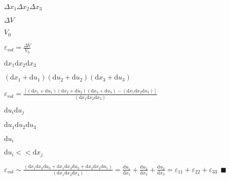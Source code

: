 \documentclass[onecolumn,11pt]{report}
\def\lthtmlcheckvsize{\ifdim\ht\sizebox<\vsize 
  \ifdim\wd\sizebox<\hsize\expandafter\hfill\fi \expandafter\vfill
  \else\expandafter\vss\fi}%
\begin{document}
{\newpage\clearpage
{}%
$ \Delta x_1 \Delta x_2 \Delta x_3$%
\lthtmlindisplaymathZ
\lthtmlcheckvsize\clearpage}

{\newpage\clearpage
{}%
$ \Delta V$%
\lthtmlindisplaymathZ
\lthtmlcheckvsize\clearpage}

{\newpage\clearpage
{}%
$ V_0$%
\lthtmlindisplaymathZ
\lthtmlcheckvsize\clearpage}

{\newpage\clearpage
{}%
$\displaystyle \varepsilon_{vol} =  \frac{\Delta V}{V_0}
$%
\lthtmlindisplaymathZ
\lthtmlcheckvsize\clearpage}

{\newpage\clearpage
{}%
$ \mathrm{d} x_1 \mathrm{d} x_2 \mathrm{d} x_3$%
\lthtmlindisplaymathZ
\lthtmlcheckvsize\clearpage}

{\newpage\clearpage
{}%
$ (\mathrm{d} x_1 + \mathrm{d}u_1)(\mathrm{d} u_2 + \mathrm{d}u_2)(\mathrm{d} x_3 + \mathrm{d} u_3)$%
\lthtmlindisplaymathZ
\lthtmlcheckvsize\clearpage}

{\newpage\clearpage
{}%
$\displaystyle \varepsilon_{vol} =  \frac{[(\mathrm{d} x_1 + \mathrm{d}u_1)(\mathrm{d} x_2 + \mathrm{d}u_2)(\mathrm{d} x_3 + \mathrm{d}u_3) - (\mathrm{d} x_1 \mathrm{d} x_2 \mathrm{d} x_3)]}{(\mathrm{d} x_1 \mathrm{d} x_2 \mathrm{d} x_3)}
$%
\lthtmlindisplaymathZ
\lthtmlcheckvsize\clearpage}

{\newpage\clearpage
{}%
$ \mathrm{d}u_i \mathrm{d}u_j$%
\lthtmlindisplaymathZ
\lthtmlcheckvsize\clearpage}

{\newpage\clearpage
{}%
$ \mathrm{d}u_1 \mathrm{d}u_2 \mathrm{d}u_3$%
\lthtmlindisplaymathZ
\lthtmlcheckvsize\clearpage}

{\newpage\clearpage
{}%
$ \mathrm{d}u_i$%
\lthtmlindisplaymathZ
\lthtmlcheckvsize\clearpage}

{\newpage\clearpage
{}%
$ \mathrm{d}u_i << \mathrm{d}x_j $%
\lthtmlindisplaymathZ
\lthtmlcheckvsize\clearpage}

{\newpage\clearpage
{}%
$\displaystyle \varepsilon_{vol} \sim  \frac{(\mathrm{d} x_1 \mathrm{d} x_2 \mathrm{d}u_3 + 
							 \mathrm{d} x_1 \mathrm{d} x_3 \mathrm{d}u_2 +
							 \mathrm{d} x_2 \mathrm{d} x_3 \mathrm{d}u_1)}
							 {(\mathrm{d} x_1 \mathrm{d} x_2 \mathrm{d} x_3)}
				=  \frac{\mathrm{d}u_1}{\mathrm{d} x_1} + 
				   \frac{\mathrm{d}u_2}{\mathrm{d} x_2} + 
				   \frac{\mathrm{d}u_3}{\mathrm{d} x_3} 
				= \varepsilon_{11} + \varepsilon_{22} + \varepsilon_{33} \: \: \blacksquare
$%
\lthtmlindisplaymathZ
\lthtmlcheckvsize\clearpage}
\end{document}
